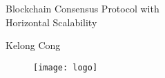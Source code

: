 \begin{titlepage}

\null\vfill

\begin{center}
\LARGE{Blockchain Consensus Protocol with\\Horizontal Scalability}
\end{center}

\vspace{1.5cm}

\begin{center}
Kelong Cong
\end{center}

\vfill

\begin{figure}[!b]
\centering
\texttt{[image: logo]}
\end{figure}

\vspace{2.0cm}

\end{titlepage}

